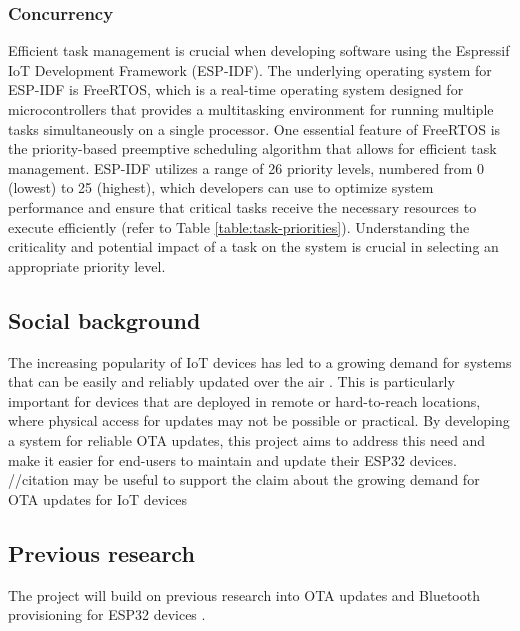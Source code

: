 \subsubsection{Concurrency}
\label{subsec:concurrency}
Efficient task management is crucial when developing software using the Espressif IoT Development Framework (ESP-IDF). The underlying operating system for ESP-IDF is FreeRTOS, which is a real-time operating system designed for microcontrollers that provides a multitasking environment for running multiple tasks simultaneously on a single processor. One essential feature of FreeRTOS is the priority-based preemptive scheduling algorithm that allows for efficient task management. ESP-IDF utilizes a range of 26 priority levels, numbered from 0 (lowest) to 25 (highest), which developers can use to optimize system performance and ensure that critical tasks receive the necessary resources to execute efficiently (refer to Table \ref{table:task-priorities}). Understanding the criticality and potential impact of a task on the system is crucial in selecting an appropriate priority level.

\subsection{Social background}
\label{sec:social}
The increasing popularity of IoT devices has led to a growing demand for systems that can be easily and reliably updated over the air \cite{Villegas:2019}. This is particularly important for devices that are deployed in remote or hard-to-reach locations, where physical access for updates may not be possible or practical. By developing a system for reliable OTA updates, this project aims to address this need and make it easier for end-users to maintain and update their ESP32 devices. //citation may be useful to support the claim about the growing demand for OTA updates for IoT devices

\subsection{Previous research}
\label{sec:previous}
The project will build on previous research into OTA updates and Bluetooth provisioning for ESP32 devices \cite{espressif:esp-idf-programming-guide}.